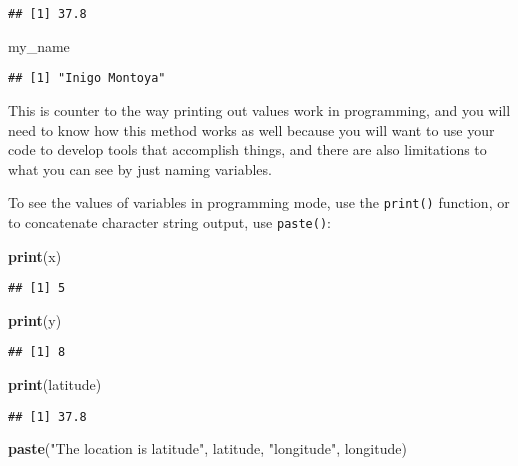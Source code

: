\documentclass[
]{book}
\newenvironment{Shaded}{\begin{snugshade}}{\end{snugshade}}
\newcommand{\KeywordTok}[1]{\textcolor[rgb]{0.13,0.29,0.53}{\textbf{#1}}}
\newcommand{\NormalTok}[1]{#1}
\newcommand{\StringTok}[1]{\textcolor[rgb]{0.31,0.60,0.02}{#1}}
\begin{document}
\begin{verbatim}
## [1] 37.8
\end{verbatim}

\begin{Shaded}
\begin{Highlighting}[]
\NormalTok{my_name}
\end{Highlighting}
\end{Shaded}

\begin{verbatim}
## [1] "Inigo Montoya"
\end{verbatim}

This is counter to the way printing out values work in programming, and you will
need to know how this method works as well because you will want to use your code
to develop tools that accomplish things, and there are also limitations to what you
can see by just naming variables.

To see the values of variables in programming mode, use the \texttt{print()} function,
or to concatenate character string output, use \texttt{paste()}:

\begin{Shaded}
\begin{Highlighting}[]
\KeywordTok{print}\NormalTok{(x)}
\end{Highlighting}
\end{Shaded}

\begin{verbatim}
## [1] 5
\end{verbatim}

\begin{Shaded}
\begin{Highlighting}[]
\KeywordTok{print}\NormalTok{(y)}
\end{Highlighting}
\end{Shaded}

\begin{verbatim}
## [1] 8
\end{verbatim}

\begin{Shaded}
\begin{Highlighting}[]
\KeywordTok{print}\NormalTok{(latitude)}
\end{Highlighting}
\end{Shaded}

\begin{verbatim}
## [1] 37.8
\end{verbatim}

\begin{Shaded}
\begin{Highlighting}[]
\KeywordTok{paste}\NormalTok{(}\StringTok{"The location is latitude"}\NormalTok{, latitude, }\StringTok{"longitude"}\NormalTok{, longitude)}
\end{Highlighting}
\end{Shaded}
\end{document}
